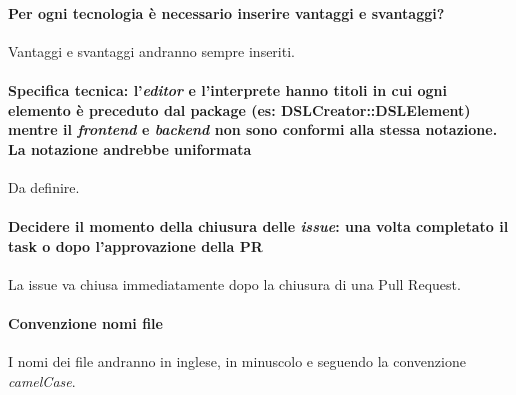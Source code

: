 \documentclass[11pt]{meetingmins}
\begin{document}
	\paragraph*{Per ogni tecnologia \`e necessario inserire vantaggi e svantaggi?}
		Vantaggi e svantaggi andranno sempre inseriti.

	\paragraph*{\textbf{Specifica tecnica}: l'\textit{editor} e l'interprete hanno titoli in cui ogni elemento è preceduto 
		dal package (es: DSLCreator::DSLElement) mentre il \textit{frontend} e \textit{backend} 
		non sono conformi alla stessa notazione. La notazione andrebbe uniformata}
		Da definire.
		
		
	\paragraph*{Decidere il momento della chiusura delle \textit{issue}: una volta completato il task o dopo l'approvazione della PR}
		La issue va chiusa immediatamente dopo la chiusura di una Pull Request.
		
	\paragraph*{Convenzione nomi file}
		I nomi dei file andranno in inglese, in minuscolo e seguendo la convenzione \textit{camelCase}.


\end{document}
